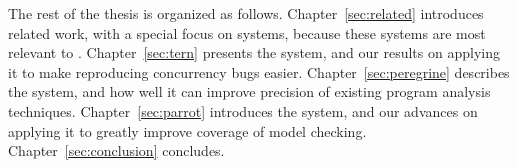 The rest of the thesis is organized as follows. Chapter~\ref{sec:related}
introduces related work, with a special focus on \dmt systems, because these
systems are most relevant to \smt. Chapter~\ref{sec:tern} presents the \tern
system, and our results on applying it to make reproducing concurrency bugs
easier. Chapter~\ref{sec:peregrine} describes the \peregrine system, and how
well it can improve precision of existing program analysis techniques.
Chapter~\ref{sec:parrot} introduces the \parrot system, and our advances on
applying it to greatly improve coverage of model checking.
Chapter~\ref{sec:conclusion} concludes.




